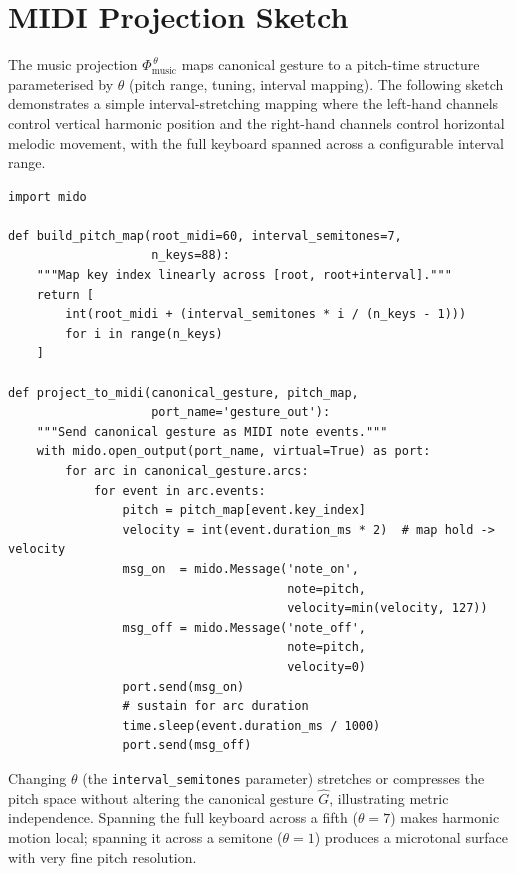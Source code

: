 \documentclass[11pt, a4paper]{article}
\begin{document}
\section{MIDI Projection Sketch}

The music projection $\Phi_{\mathrm{music}}^{\,\theta}$ maps canonical
gesture to a pitch-time structure parameterised by $\theta$ (pitch
range, tuning, interval mapping). The following sketch demonstrates a
simple interval-stretching mapping where the left-hand channels control
vertical harmonic position and the right-hand channels control horizontal
melodic movement, with the full keyboard spanned across a configurable
interval range.

\begin{lstlisting}[style=pycode, caption={MIDI projection with interval mapping (\texttt{mido})}]
import mido

def build_pitch_map(root_midi=60, interval_semitones=7,
                    n_keys=88):
    """Map key index linearly across [root, root+interval]."""
    return [
        int(root_midi + (interval_semitones * i / (n_keys - 1)))
        for i in range(n_keys)
    ]

def project_to_midi(canonical_gesture, pitch_map,
                    port_name='gesture_out'):
    """Send canonical gesture as MIDI note events."""
    with mido.open_output(port_name, virtual=True) as port:
        for arc in canonical_gesture.arcs:
            for event in arc.events:
                pitch = pitch_map[event.key_index]
                velocity = int(event.duration_ms * 2)  # map hold -> velocity
                msg_on  = mido.Message('note_on',
                                       note=pitch,
                                       velocity=min(velocity, 127))
                msg_off = mido.Message('note_off',
                                       note=pitch,
                                       velocity=0)
                port.send(msg_on)
                # sustain for arc duration
                time.sleep(event.duration_ms / 1000)
                port.send(msg_off)
\end{lstlisting}

Changing $\theta$ (the \texttt{interval\_semitones} parameter) stretches
or compresses the pitch space without altering the canonical gesture
$\hat{G}$, illustrating metric independence. Spanning the full keyboard
across a fifth ($\theta = 7$) makes harmonic motion local; spanning it
across a semitone ($\theta = 1$) produces a microtonal surface with very
fine pitch resolution.
\end{document}
